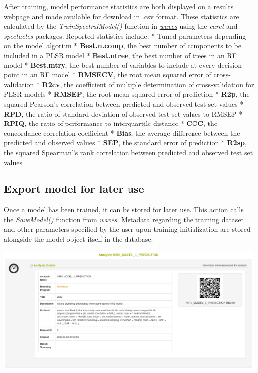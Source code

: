 \documentclass[
  12pt,
]{book}
\begin{document}
After training, model performance statistics are both displayed on a results webpage and made available for download in .csv format. These statistics are calculated by the \emph{TrainSpectralModel()} function in \href{https://CRAN.R-project.org/package=waves}{\emph{waves}} using the \emph{caret} and \emph{spectacles} packages. Reported statistics include: * Tuned parameters depending on the model algoritm * \textbf{Best.n.comp}, the best number of components to be included in a PLSR model * \textbf{Best.ntree}, the best number of trees in an RF model * \textbf{Best.mtry}, the best number of variables to include at every decision point in an RF model * \textbf{RMSECV}, the root mean squared error of cross-validation * \textbf{R2cv}, the coefficient of multiple determination of cross-validation for PLSR models * \textbf{RMSEP}, the root mean squared error of prediction * \textbf{R2p}, the squared Pearson's correlation between predicted and observed test set values * \textbf{RPD}, the ratio of standard deviation of observed test set values to RMSEP * \textbf{RPIQ}, the ratio of performance to interquartile distance * \textbf{CCC}, the concordance correlation coefficient * \textbf{Bias}, the average difference between the predicted and observed values * \textbf{SEP}, the standard error of prediction * \textbf{R2sp}, the squared Spearman''s rank correlation between predicted and observed test set values

\hypertarget{export-model-for-later-use}{%
\subsection{Export model for later use}\label{export-model-for-later-use}}

Once a model has been trained, it can be stored for later use. This action calls the \emph{SaveModel()} function from \href{https://CRAN.R-project.org/package=waves}{\emph{waves}}. Metadata regarding the training dataset and other parameters specified by the user upon training initialization are stored alongside the model object itself in the database.

\begin{center}\includegraphics[width=0.95\linewidth]{assets/images/manage_NIRS_export_model} \end{center}
\end{document}
